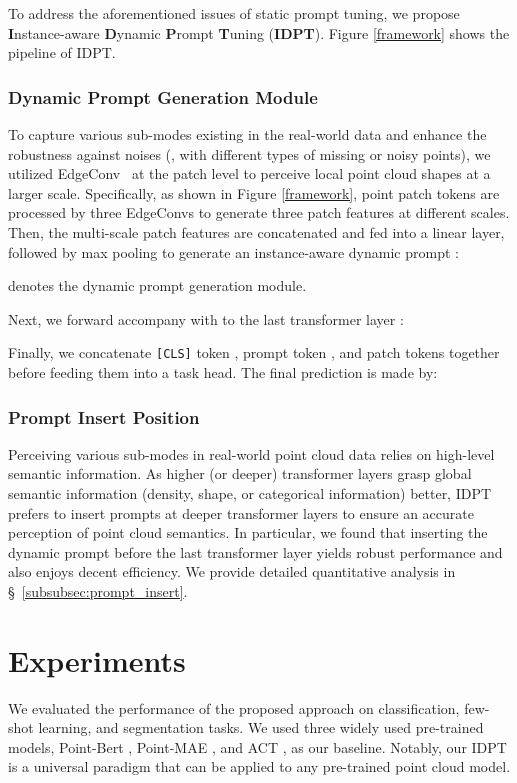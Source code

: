 \documentclass[10pt,twocolumn,letterpaper]{article}
\begin{document}
To address the aforementioned issues of static prompt tuning, we propose \textbf{I}nstance-aware \textbf{D}ynamic \textbf{P}rompt \textbf{T}uning (\textbf{IDPT}). Figure \ref{framework} shows the pipeline of IDPT. 

\subsubsection{Dynamic Prompt Generation Module}
To capture various sub-modes existing in the real-world data and enhance the robustness against noises (\eg, with different types of missing or noisy points), we utilized EdgeConv~\cite{wang2019dynamic} at the patch level to perceive local point cloud shapes at a larger scale. 
Specifically, as shown in Figure \ref{framework}, point patch tokens  are processed by three EdgeConvs to generate three patch features at different scales. 
Then, the multi-scale patch features are concatenated and fed into a linear layer, followed by max pooling to generate an instance-aware dynamic prompt :

 denotes the dynamic prompt generation module. 

Next, we forward  accompany with  to the last transformer layer : 


Finally, we concatenate \texttt{[CLS]} token , prompt token , and patch tokens  together before feeding them into a task head. 
The final prediction is made by:


\subsubsection{Prompt Insert Position}
Perceiving various sub-modes in real-world point cloud data relies on high-level semantic information. 
As higher (or deeper) transformer layers grasp global semantic information (\eg density, shape, or categorical information) better, IDPT prefers to insert prompts at deeper transformer layers to ensure an accurate perception of point cloud semantics. In particular, we found that inserting the dynamic prompt before the last transformer layer yields robust performance and also enjoys decent efficiency. We provide detailed quantitative analysis in \S~\ref{subsubsec:prompt_insert}.

\section{Experiments}

We evaluated the performance of the proposed approach on classification, few-shot learning, and segmentation tasks. 
We used three widely used pre-trained models, Point-Bert \cite{yu2022point}, Point-MAE \cite{pang2022masked}, and ACT \cite{dong2022autoencoders}, as our baseline. 
Notably, our IDPT is a universal paradigm that can be applied to any pre-trained point cloud model. 
\end{document}
